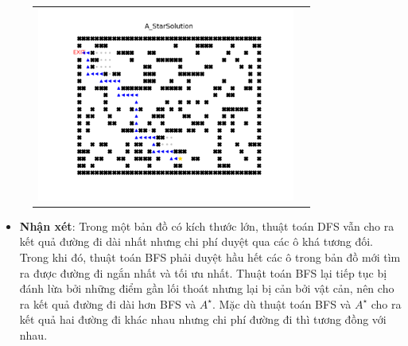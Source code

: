 \documentclass[11pt]{scrartcl} %
\begin{document}
\begin{itemize}
\begin{figure}[h]
\begin{tabular}{cc}
			\includegraphics[width=8.5cm]{Figures/fg5_astar.png}
		\end{tabular}
	\end{figure}
	\begin{itemize}
		\item \textbf{Nhận xét}: Trong một bản đồ có kích thước lớn, thuật toán DFS vẫn cho ra kết quả đường đi dài nhất nhưng chi phí duyệt qua các ô khá tương đối. Trong khi đó, thuật toán BFS phải duyệt hầu hết các ô trong bản đồ mới tìm ra được đường đi ngắn nhất và tối ưu nhất. Thuật toán BFS lại tiếp tục bị đánh lừa bởi những điểm gần lối thoát nhưng lại bị cản bởi vật cản, nên cho ra kết quả đường đi dài hơn BFS và $A^{\star}$. Mặc dù thuật toán BFS và $A^{\star}$ cho ra kết quả hai đường đi khác nhau nhưng chi phí đường đi thì tương đồng với nhau.
	\end{itemize}
	\end{itemize}

\newpage
\end{document}
